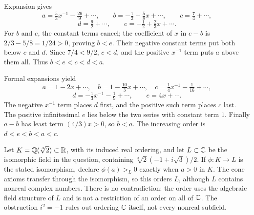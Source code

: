 Expansion gives
\[a=\tfrac53x^{-1}-\tfrac{26}{9}+\cdots,\qquad
b=-\tfrac12+\tfrac58x+\cdots,\qquad
c=\tfrac74+\cdots,
\]
\[d=\tfrac92+\cdots,\qquad e=-\tfrac12+\tfrac23x+\cdots.
\]
For $b$ and $e$, the constant terms cancel; the coefficient of $x$ in $e-b$ is $2/3-5/8=1/24>0$, proving $b<e$. Their negative constant terms put both below $c$ and $d$. Since $7/4<9/2$, $c<d$, and the positive $x^{-1}$ term puts $a$ above them all. Thus $\boxed{b<e<c<d<a}$.

Formal expansions yield
\[a=1-2x+\cdots,\quad b=1-\tfrac{10}{3}x+\cdots,\quad
c=\tfrac14x^{-1}-\tfrac1{16}+\cdots,
\]
\[d=-\tfrac13x^{-1}-\tfrac19+\cdots,\qquad e=4x+\cdots.
\]
The negative $x^{-1}$ term places $d$ first, and the positive such term places $c$ last. The positive infinitesimal $e$ lies below the two series with constant term $1$. Finally $a-b$ has least term $(4/3)x>0$, so $b<a$. The increasing order is $\boxed{d<e<b<a<c}$.

Let $K=\mathbb{Q}(\sqrt[3]2)\subset\mathbb{R}$, with its induced real ordering, and let $L\subset\mathbb{C}$ be the isomorphic field in the question, containing $\sqrt[3]2(-1+i\sqrt3)/2$. If $\phi:K\to L$ is the stated isomorphism, declare $\phi(a)>_L0$ exactly when $a>0$ in $K$. The cone axioms transfer through the isomorphism, so this orders $L$, although $L$ contains nonreal complex numbers. There is no contradiction: the order uses the algebraic field structure of $L$ and is not a restriction of an order on all of $\mathbb{C}$. The obstruction $i^2=-1$ rules out ordering $\mathbb{C}$ itself, not every nonreal subfield.

